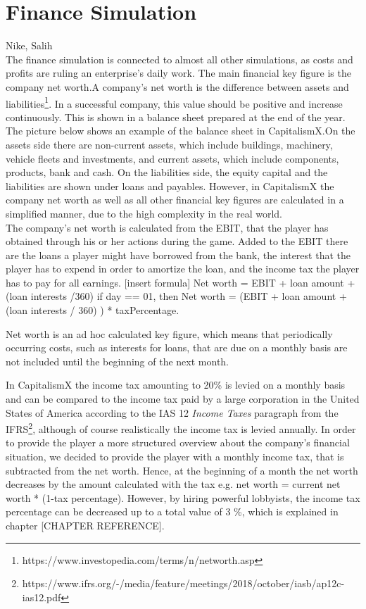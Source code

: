 \section{Finance Simulation}
\label{sec:diag}
Nike, Salih\\
The finance simulation is connected to almost all other simulations, as costs and profits are ruling an enterprise's daily work. The main financial key figure is the company net worth.A company's net worth is the difference between assets and liabilities\footnote{https://www.investopedia.com/terms/n/networth.asp}. In a successful company, this value should be positive and increase continuously. This is shown in a balance sheet prepared at the end of the year. The picture below shows an example of the balance sheet in CapitalismX.On the assets side there are non-current assets, which include buildings, machinery, vehicle fleets and investments, and current assets, which include components, products, bank and cash. On the liabilities side, the equity capital and the liabilities are shown under loans and payables. However, in CapitalismX the company net worth as well as all other financial key figures are calculated in a simplified manner, due to the high complexity in the real world.\\

The company’s net worth is calculated from the EBIT, that the player has obtained through his or her actions during the game. Added to the EBIT there are the loans a player might have borrowed from the bank, the interest that the player has to expend in order to amortize the loan, and the income tax the player has to pay for all earnings. [insert formula]
Net worth = EBIT + loan amount + (loan interests /360) if day == 01, then Net worth = (EBIT + loan amount + (loan interests / 360) ) * taxPercentage.

Net worth is an ad hoc calculated key figure, which means that periodically occurring costs, such as interests for loans, that are due on a monthly basis are not included until the beginning of the next month. 

In CapitalismX the income tax amounting to 20\% is levied on a monthly basis and can be compared to the income tax paid by a large corporation in the United States of America according to the IAS 12 \textit{Income Taxes} paragraph from the IFRS\footnote{https://www.ifrs.org/-/media/feature/meetings/2018/october/iasb/ap12c-ias12.pdf}, although of course realistically the income tax is levied annually. In order to provide the player a more structured overview about the company’s financial situation, we decided to provide the player with a monthly income tax, that is subtracted from the net worth. Hence, at the beginning of a month the net worth decreases by the amount calculated with the tax e.g. net worth = current net worth * (1-tax percentage). However, by hiring powerful lobbyists, the income tax percentage can be decreased up to a total value of 3 \%, which is explained in chapter [CHAPTER REFERENCE].\\

